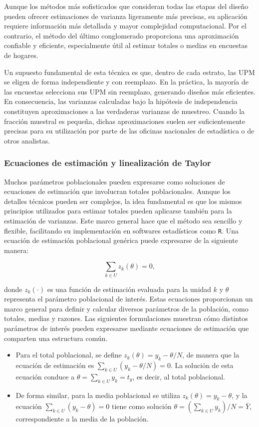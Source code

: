 \documentclass[
  spanish,
  11pt,
  letterpaper,
  oneside,
  open=any]{scrbook}
\providecommand{\tightlist}{%
  \setlength{\itemsep}{0pt}\setlength{\parskip}{0pt}}
\begin{document}
Aunque los métodos más sofisticados que consideran todas las etapas del
diseño pueden ofrecer estimaciones de varianza ligeramente más precisas,
su aplicación requiere información más detallada y mayor complejidad
computacional. Por el contrario, el método del último conglomerado
proporciona una aproximación confiable y eficiente, especialmente útil
al estimar totales o medias en encuestas de hogares.

Un supuesto fundamental de esta técnica es que, dentro de cada estrato,
las UPM se eligen de forma independiente y con reemplazo. En la
práctica, la mayoría de las encuestas selecciona sus UPM sin reemplazo,
generando diseños más eficientes. En consecuencia, las varianzas
calculadas bajo la hipótesis de independencia constituyen aproximaciones
a las verdaderas varianzas de muestreo. Cuando la fracción muestral es
pequeña, dichas aproximaciones suelen ser suficientemente precisas para
su utilización por parte de las oficinas nacionales de estadística o de
otros analistas.

\subsubsection{Ecuaciones de estimación y linealización de
Taylor}\label{ecuaciones-de-estimacion}

Muchos parámetros poblacionales pueden expresarse como soluciones de
ecuaciones de estimación que involucran totales poblacionales. Aunque
los detalles técnicos pueden ser complejos, la idea fundamental es que
los mismos principios utilizados para estimar totales pueden aplicarse
también para la estimación de varianzas. Este marco general hace que el
método sea sencillo y flexible, facilitando su implementación en
softwares estadísticos como \texttt{R}. Una ecuación de estimación
poblacional genérica puede expresarse de la siguiente manera:

\[\sum_{k\in U} z_k(\theta)=0,\]

donde \(z_k(\cdot)\) es una función de estimación evaluada para la
unidad \(k\) y \(\theta\) representa el parámetro poblacional de
interés. Estas ecuaciones proporcionan un marco general para definir y
calcular diversos parámetros de la población, como totales, medias y
razones. Las siguientes formulaciones muestran cómo distintos parámetros
de interés pueden expresarse mediante ecuaciones de estimación que
comparten una estructura común.

\begin{itemize}
\tightlist
\item
  Para el total poblacional, se define \(z_k(\theta)=y_k-\theta/N\), de
  manera que la ecuación de estimación es
  \(\sum_{k\in U}(y_k-\theta/N)=0\). La solución de esta ecuación
  conduce a \(\theta=\sum_{k\in U} y_k = t_y\), es decir, al total
  poblacional.
\item
  De forma similar, para la media poblacional se utiliza
  \(z_k(\theta)=y_k-\theta\), y la ecuación
  \(\sum_{k\in U}(y_k-\theta)=0\) tiene como solución
  \(\theta=\left(\sum_{k\in U} y_k\right)/N = \bar{Y}\), correspondiente
  a la media de la población.
\end{itemize}
\end{document}
